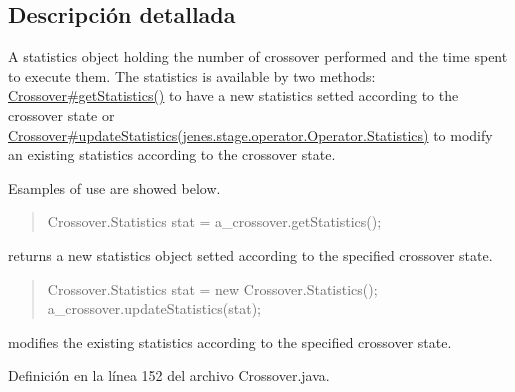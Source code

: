 \subsection{Descripción detallada}
A statistics object holding the number of crossover performed and the time spent to execute them. The statistics is available by two methods\-: \hyperlink{}{Crossover\#get\-Statistics()} to have a new statistics setted according to the crossover state or \hyperlink{}{Crossover\#update\-Statistics(jenes.\-stage.\-operator.\-Operator.\-Statistics)} to modify an existing statistics according to the crossover state. 

Esamples of use are showed below. 

\begin{quotation}

\begin{DoxyPre}
Crossover.Statistics stat = a\_crossover.getStatistics();
\end{DoxyPre}
\end{quotation}


returns a new statistics object setted according to the specified crossover state. 

\begin{quotation}

\begin{DoxyPre}
Crossover.Statistics stat = new Crossover.Statistics();
a\_crossover.updateStatistics(stat);
\end{DoxyPre}
\end{quotation}


modifies the existing statistics according to the specified crossover state. 

Definición en la línea 152 del archivo Crossover.\-java.



